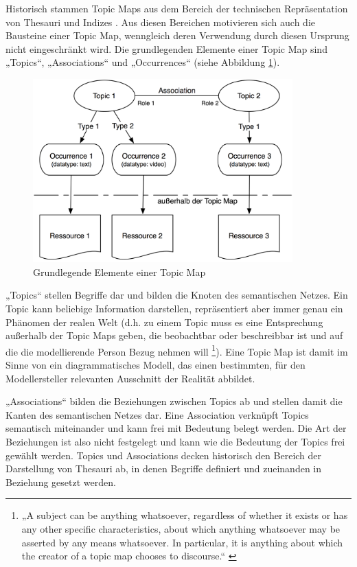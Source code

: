 Historisch stammen Topic Maps aus dem Bereich der technischen Repräsentation von Thesauri und Indizes \citep{Pepper00} \citep{Rath03}. Aus diesen Bereichen motivieren sich auch die Bausteine einer Topic Map, wenngleich deren Verwendung durch diesen Ursprung nicht eingeschränkt wird. Die grundlegenden Elemente einer Topic Map sind „Topics“, „Associations“ und „Occurrences“ (siehe Abbildung \ref{fig:img_Persistenz_TMBasic}). 

\begin{figure}[htbp]
	\centering
		\includegraphics[width=10cm]{img/Persistenz/TMBasic.png}
	\caption{Grundlegende Elemente einer Topic Map}
	\label{fig:img_Persistenz_TMBasic}
\end{figure}

„Topics“ stellen Begriffe dar und bilden die Knoten des semantischen Netzes. Ein Topic kann beliebige Information darstellen, repräsentiert aber immer genau ein Phänomen der realen Welt (d.h. zu einem Topic muss es eine Entsprechung außerhalb der Topic Maps geben, die beobachtbar oder beschreibbar ist und auf die die modellierende Person Bezug nehmen will \footnote{„A subject can be anything whatsoever, regardless of whether it exists or has any other specific characteristics, about which anything whatsoever may be asserted by any means whatsoever. In particular, it is anything about which the creator of a topic map chooses to discourse.“ \citep[][S.8]{TMDM08}}). Eine Topic Map ist damit im Sinne von \citet{Stachowiak73} ein diagrammatisches Modell, das einen bestimmten, für den Modellersteller relevanten Ausschnitt der Realität abbildet.

„Associations“ bilden die Beziehungen zwischen Topics ab und stellen damit die Kanten des semantischen Netzes dar. Eine Association verknüpft Topics semantisch miteinander und kann frei mit Bedeutung belegt werden. Die Art der Beziehungen ist also nicht festgelegt und kann wie die Bedeutung der Topics frei gewählt werden. Topics und Associations decken historisch den Bereich der Darstellung von Thesauri ab, in denen Begriffe definiert und zueinanden in Beziehung gesetzt werden. 

